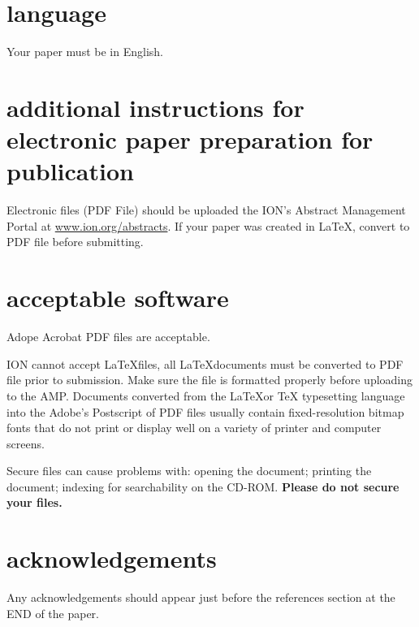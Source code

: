 \documentclass[letterpaper,times]{IONconf}
\begin{document}
\section{language}

Your paper must be in English.

\section{additional instructions for electronic paper preparation for publication}

Electronic files (PDF File) should be uploaded the ION’s Abstract Management Portal at \url{www.ion.org/abstracts}. If your paper was created in \LaTeX, convert to PDF file before submitting.


\section{acceptable software}

Adope Acrobat PDF files are acceptable.

ION cannot accept \LaTeX files, all \LaTeX documents must be converted to PDF file prior to submission. Make sure the file is formatted properly before uploading to the AMP.  Documents converted from the \LaTeX or TeX typesetting language into the Adobe’s Postscript of PDF files usually contain fixed-resolution bitmap fonts that do not print or display well on a variety of printer and computer screens.  

Secure files can cause problems with: opening the document; printing the document; indexing for searchability on the CD-ROM. \textbf{\large{Please do not secure your files.}}


\section*{acknowledgements}

Any acknowledgements should appear just before the references section at the END of the paper.



\end{document}
